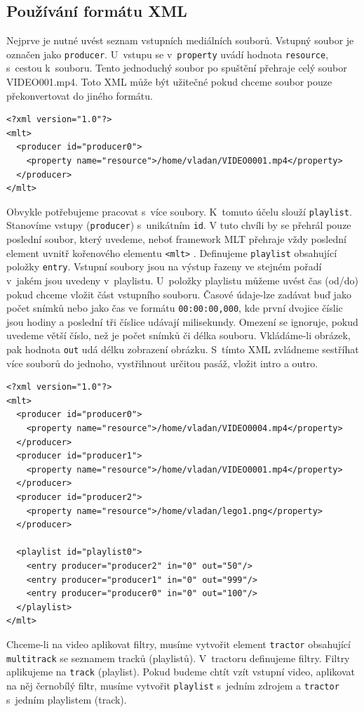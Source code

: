 \subsection{Používání formátu XML}
Nejprve je nutné uvést seznam vstupních mediálních souborů. Vstupný soubor je označen jako \texttt{producer}. U~vstupu se v~\texttt{property} uvádí hodnota \texttt{resource}, s~cestou k~souboru. Tento jednoduchý soubor po spuštění přehraje celý soubor VIDEO001.mp4. Toto XML může být užitečné pokud chceme soubor pouze překonvertovat do jiného formátu.
\begin{lstlisting}[style=xml]
<?xml version="1.0"?>
<mlt>
  <producer id="producer0">
    <property name="resource">/home/vladan/VIDEO0001.mp4</property>
  </producer>
</mlt>
\end{lstlisting}
Obvykle potřebujeme pracovat s~více soubory. K~tomuto účelu slouží \texttt{playlist}. Stanovíme vstupy (\texttt{producer}) s~unikátním \texttt{id}. V tuto chvíli by se přehrál pouze poslední soubor, který uvedeme, neboť framework MLT přehraje vždy poslední element uvnitř kořenového elementu \texttt{<mlt>} . Definujeme \texttt{playlist} obsahující položky \texttt{entry}. Vstupní soubory jsou na výstup řazeny ve stejném pořadí v~jakém jsou uvedeny v~playlistu. U~položky playlistu můžeme uvést čas (od/do) pokud chceme vložit část vstupního souboru. Časové údaje-lze zadávat buď jako počet snímků nebo jako čas ve formátu \texttt{00:00:00,000}, kde první dvojice číslic jsou hodiny a poslední tři číslice udávají milisekundy. Omezení se ignoruje, pokud uvedeme větší číslo, než je počet snímků či délka souboru. Vkládáme-li obrázek, pak hodnota \texttt{out} udá délku zobrazení obrázku. S~tímto XML zvládneme sestříhat více souborů do jednoho, vystřihnout určitou pasáž, vložit intro a outro.
\begin{lstlisting}[style=xml]
<?xml version="1.0"?>
<mlt>
  <producer id="producer0">
    <property name="resource">/home/vladan/VIDEO0004.mp4</property>
  </producer>
  <producer id="producer1">
    <property name="resource">/home/vladan/VIDEO0001.mp4</property>
  </producer>
  <producer id="producer2">
    <property name="resource">/home/vladan/lego1.png</property>
  </producer>

  <playlist id="playlist0">
    <entry producer="producer2" in="0" out="50"/>
    <entry producer="producer1" in="0" out="999"/>
    <entry producer="producer0" in="0" out="100"/>
  </playlist>
</mlt>
\end{lstlisting}
Chceme-li na video aplikovat filtry, musíme vytvořit element \texttt{tractor} obsahující \texttt{multitrack} se seznamem tracků (playlistů). V~tractoru definujeme filtry. Filtry aplikujeme na \texttt{track} (playlist). Pokud budeme chtít vzít vstupní video, aplikovat na něj černobílý filtr, musíme vytvořit \texttt{playlist} s~jedním zdrojem a \texttt{tractor} s~jedním playlistem (track).
